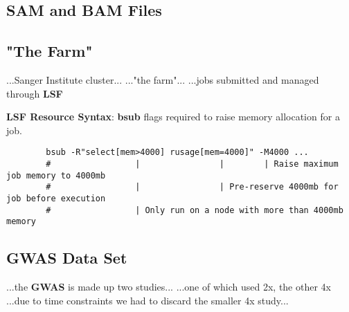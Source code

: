 \subsection{SAM and BAM Files}

\subsection{"The Farm"}

...Sanger Institute cluster...
..."the farm"...
...jobs submitted and managed through \textbf{LSF}

\begin{listing}[H]
    \caption[lsf-memory]{\textbf{LSF Resource Syntax}: \textbf{bsub} flags
        required to raise memory allocation for a job.}
    \label{list:lsf-memory}
    \begin{verbatim}
        bsub -R"select[mem>4000] rusage[mem=4000]" -M4000 ...
        #                 |                |        | Raise maximum job memory to 4000mb
        #                 |                | Pre-reserve 4000mb for job before execution
        #                 | Only run on a node with more than 4000mb memory
    \end{verbatim}
\end{listing}

\subsection{GWAS Data Set}
...the \textbf{GWAS} is made up two studies...
...one of which used 2x, the other 4x
...due to time constraints we had to discard the smaller 4x study...

